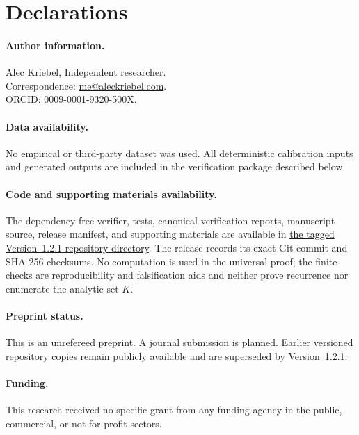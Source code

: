 \section*{Declarations}

\paragraph{Author information.}
Alec Kriebel, Independent researcher.\\
Correspondence: \mbox{\href{mailto:me@aleckriebel.com}{me@aleckriebel.com}}.\\
ORCID: \href{https://orcid.org/0009-0001-9320-500X}{0009-0001-9320-500X}.

\paragraph{Data availability.}
No empirical or third-party dataset was used.  All deterministic calibration
inputs and generated outputs are included in the verification package
described below.

\paragraph{Code and supporting materials availability.}
The dependency-free verifier, tests, canonical verification reports,
manuscript source, release manifest, and supporting materials are available in
\href{https://github.com/AlecKriebel/Math/tree/bimolecular-positive-recurrence-v1.2.1/bimolecular_positive_recurrence_submission_v1_2_1}{the tagged Version~1.2.1 repository directory}.
The release records its exact Git commit and SHA-256 checksums.  No computation
is used in the universal proof; the finite checks are reproducibility and
falsification aids and neither prove recurrence nor enumerate the analytic set
\(K\).

\paragraph{Preprint status.}
This is an unrefereed preprint.  A journal submission is planned.  Earlier
versioned repository copies remain publicly available and are superseded by
Version~1.2.1.

\paragraph{Funding.}
This research received no specific grant from any funding agency in the public,
commercial, or not-for-profit sectors.

